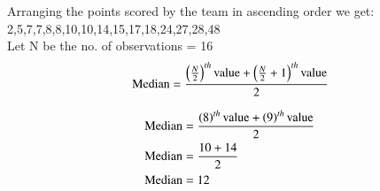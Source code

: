 Arranging the points scored by the  team in ascending order we get:\\
2,5,7,7,8,8,10,10,14,15,17,18,24,27,28,48\\
Let N be the no. of observations = 16\\
\begin{align}
\text{Median} = \frac{\left(\frac{N}{2}\right)^{th}\text{value} + \left(\frac{N}{2}+1\right)^{th}\text{value}}{2}
\end{align}

\begin{align}
\text{Median} &= \frac{\left(8\right)^{th}\text{value} + \left(9\right)^{th}\text{value}}{2}\\
\text{Median} &= \frac{10 + 14}{2}\\
\text{Median} &= 12
\end{align}
